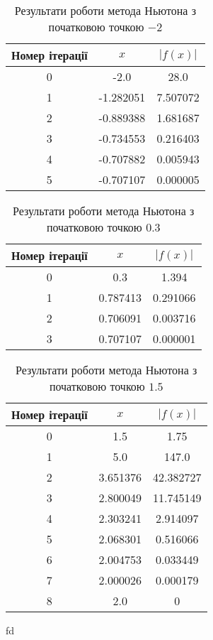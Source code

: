 \begin{table}[h!]
    \centering
    \begin{tabular}{|c|c|c|}
        \hline
        \textbf{Номер ітерації} & $x$ & $|f(x)|$ \\
        \hline
        0 & -2.0 & 28.0 \\
        \hline
        1 & -1.282051 & 7.507072 \\
        \hline
        2 & -0.889388 & 1.681687 \\
        \hline
        3 & -0.734553 & 0.216403 \\
        \hline
        4 & -0.707882 & 0.005943 \\
        \hline
        5 & -0.707107 & 0.000005 \\
        \hline
    \end{tabular}
    \caption{Результати роботи метода Ньютона з початковою точкою $-2$}
\end{table}

\begin{table}[h!]
    \centering
    \begin{tabular}{|c|c|c|}
        \hline
        \textbf{Номер ітерації} & $x$ & $|f(x)|$ \\
        \hline
        0 & 0.3 & 1.394 \\
        \hline
        1 & 0.787413 & 0.291066 \\
        \hline
        2 & 0.706091 & 0.003716 \\
        \hline
        3 & 0.707107 & 0.000001 \\
        \hline
    \end{tabular}
    \caption{Результати роботи метода Ньютона з початковою точкою $0.3$}
\end{table}

\begin{table}[h!]
    \centering
    \begin{tabular}{|c|c|c|}
        \hline
        \textbf{Номер ітерації} & $x$ & $|f(x)|$ \\
        \hline
        0 & 1.5 & 1.75 \\
        \hline
        1 & 5.0 & 147.0 \\
        \hline
        2 & 3.651376 & 42.382727 \\
        \hline
        3 & 2.800049 & 11.745149 \\
        \hline
        4 & 2.303241 & 2.914097 \\
        \hline
        5 & 2.068301 & 0.516066 \\
        \hline
        6 & 2.004753 & 0.033449 \\
        \hline
        7 & 2.000026 & 0.000179 \\
        \hline
        8 & 2.0 & 0 \\
        \hline
    \end{tabular}
    \caption{fd}
    \caption{Результати роботи метода Ньютона з початковою точкою $1.5$}
\end{table}

